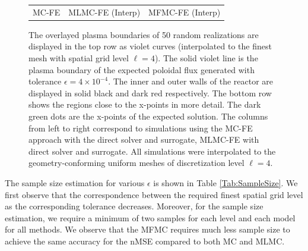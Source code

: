\begin{figure}[ht!]
\begin{tabular}{ccc}
\\[1ex]
\quad MC-FE &MLMC-FE (Interp) &MFMC-FE (Interp) \\[-0.5ex]
\end{tabular}
\caption{The overlayed plasma boundaries of 50 random realizations are 
displayed in the top row as violet curves (interpolated to the finest mesh with spatial grid level $\ell=4$). The solid violet line is the plasma boundary of the expected 
poloidal flux generated with tolerance $\epsilon=4\times 10^{-4}$. 
The inner and outer walls of the reactor are displayed in solid black and 
dark red respectively. The bottom row shows the regions close to the 
x-points in more detail. The dark green dots are the x-points of the expected 
solution. The columns from left to right correspond to simulations using the 
MC-FE approach with the direct solver and surrogate, MLMC-FE with direct 
solver and surrogate. All simulations were interpolated to the geometry-conforming uniform meshes of discretization level $\ell=4$.} 
\label{fig:QoI_plot}
\end{figure}
%





The sample size estimation for various $\epsilon$ is shown in Table \ref{Tab:SampleSize}. We first observe that the correspondence between the required finest spatial grid level as the corresponding tolerance decreases. Moreover, for the sample size estimation, we require a minimum of two samples for each level and each model for all methods. We observe that the MFMC requires much less sample size to achieve the same accuracy for the nMSE compared to both MC and MLMC.


